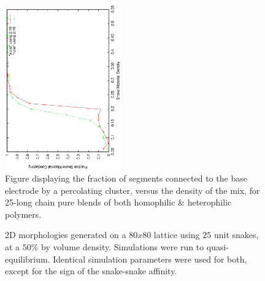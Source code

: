 \documentclass[twocolumn,a4,notitlepage]{article}
\begin{document}
\begin{figure}[htb]
\centering
\label{percolate}
\includegraphics[width=5cm,angle=270]{figures/percolate.eps}
\caption{Figure displaying the fraction of segments connected to the base
electrode by a percolating cluster, versus the density of the mix, for 
25-long chain pure blends of both homophilic \& heterophilic polymers.}
\end{figure}

\begin{figure}[htb]
\centering
{}
\caption{2D morphologies generated on a $80x80$ lattice using $25$ unit
snakes, at a $50\%$ by volume density. Simulations were run to
quasi-equilibrium. Identical simulation parameters were used for both,
except for the sign of the snake-snake affinity.}
\label{2d_morphology}

\end{figure}
\end{document}
